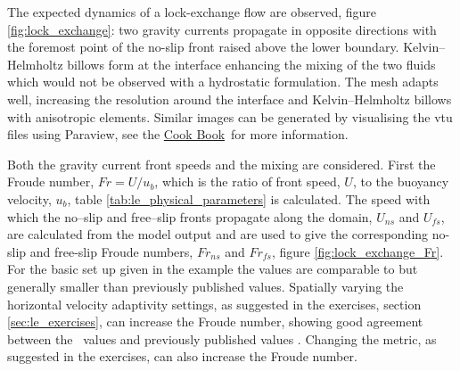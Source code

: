 The expected dynamics of a lock-exchange flow are observed, figure \ref{fig:lock_exchange}: two gravity currents propagate in opposite directions with the foremost point of the no-slip front raised above the lower boundary. Kelvin--Helmholtz billows form at the interface enhancing the mixing of the two fluids which would not be observed with a hydrostatic formulation. The mesh adapts well, increasing the resolution around the interface and Kelvin--Helmholtz billows with anisotropic elements. Similar images can be generated by visualising the vtu files using Paraview, see the \href{http://amcg.ese.ic.ac.uk/index.php?title=Cook_Book}{Cook Book}\ for more information.

Both the gravity current front speeds and the mixing are considered. First the Froude number, $Fr = U/u_b$, which is the ratio of front speed, $U$, to the buoyancy velocity, $u_b$, table \ref{tab:le_physical_parameters} is calculated. The speed with which the no--slip and free--slip fronts propagate along the domain, $U_{ns}$ and $U_{fs}$, are calculated from the model output and are used to give the corresponding no-slip and free-slip Froude numbers, $Fr_{ns}$ and $Fr_{fs}$, figure \ref{fig:lock_exchange_Fr}. For the basic set up given in the example the values are comparable to but generally smaller than previously published values. Spatially varying the horizontal velocity adaptivity settings, as suggested in the exercises, section \ref{sec:le_exercises}, can increase the Froude number, showing good agreement between the \fluidity\ values and previously published values \citep{hiester2011}. Changing the metric, as suggested in the exercises, can also increase the Froude number.


